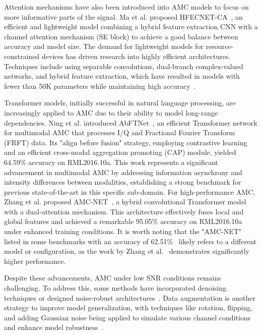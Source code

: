 \documentclass[conference]{IEEEtran}
\begin{document}
Attention mechanisms have also been introduced into AMC models to focus on more informative parts of the signal. Ma et al. proposed HFECNET-CA~\cite{ma2023hfecnetca}, an efficient and lightweight model combining a hybrid feature extraction CNN with a channel attention mechanism (SE block) to achieve a good balance between accuracy and model size. The demand for lightweight models for resource-constrained devices has driven research into highly efficient architectures. Techniques include using separable convolutions, dual-branch complex-valued networks, and hybrid feature extraction, which have resulted in models with fewer than 50K parameters while maintaining high accuracy~\cite{guo2024ulcnn, ma2023hfecnetca, xu2025ldcvnn}.

Transformer models, initially successful in natural language processing, are increasingly applied to AMC due to their ability to model long-range dependencies. Ning et al. introduced AbFTNet~\cite{ning2024abftnet}, an efficient Transformer network for multimodal AMC that processes I/Q and Fractional Fourier Transform (FRFT) data. Its "align before fusion" strategy, employing contrastive learning and an efficient cross-modal aggregation promoting (CAP) module, yielded 64.59\% accuracy on RML2016.10a. This work represents a significant advancement in multimodal AMC by addressing information asynchrony and intensity differences between modalities, establishing a strong benchmark for previous state-of-the-art in this specific sub-domain. For high-performance AMC, Zhang et al. proposed AMC-NET~\cite{zhang2023amcnet}, a hybrid convolutional Transformer model with a dual-attention mechanism. This architecture effectively fuses local and global features and achieved a remarkable 95.05\% accuracy on RML2016.10a under enhanced training conditions. It is worth noting that the "AMC-NET" listed in some benchmarks with an accuracy of 62.51\%~\cite{zhang2023amcnet} likely refers to a different model or configuration, as the work by Zhang et al.~\cite{zhang2023amcnet} demonstrates significantly higher performance.

Despite these advancements, AMC under low SNR conditions remains challenging. To address this, some methods have incorporated denoising techniques or designed noise-robust architectures~\cite{yao2019modulation}. Data augmentation is another strategy to improve model generalization, with techniques like rotation, flipping, and adding Gaussian noise being applied to simulate various channel conditions and enhance model robustness~\cite{zhang2023efficient}.
\end{document}
